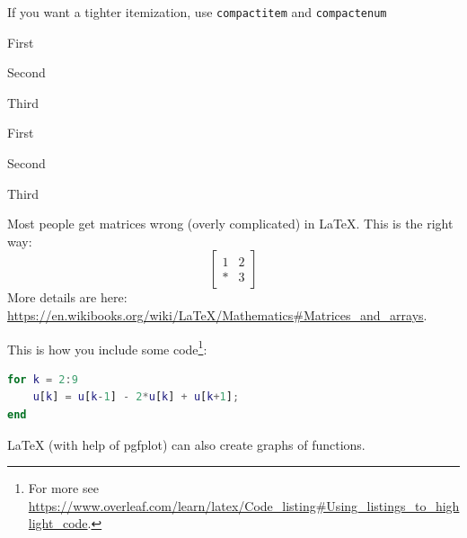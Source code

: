 \documentclass{amsart}
\begin{document}
If you want a tighter itemization, use \verb|compactitem| and \verb|compactenum|
\begin{compactitem}
\item First
\item Second
\item Third
\end{compactitem}

\begin{compactenum}
\item First
\item Second
\item Third
\end{compactenum}

Most people get matrices wrong (overly complicated) in \LaTeX. This is the right way:
\[ %
  \begin{bmatrix}
    1 & 2 \\
    \ast & 3
  \end{bmatrix}
\]
More details are here:
\url{https://en.wikibooks.org/wiki/LaTeX/Mathematics\#Matrices_and_arrays}.

This is how you include some code\footnote{For more see \url{https://www.overleaf.com/learn/latex/Code_listing\#Using_listings_to_highlight_code}.}:
\begin{lstlisting}[language=Matlab]
for k = 2:9
    u[k] = u[k-1] - 2*u[k] + u[k+1];
end
\end{lstlisting}

LaTeX (with help of pgfplot) can also create graphs of functions.
\begin{figure}[htb]\centering
 \end{figure}
\end{document}
